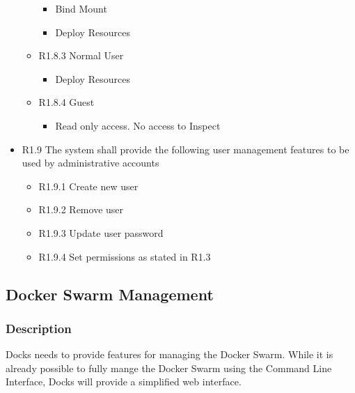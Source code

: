 \documentclass[]{article}
\begin{document}
\begin{itemize}
\begin{itemize}
			\begin{itemize}
				\item Bind Mount
				\item Deploy Resources
			\end{itemize}
		\item R1.8.3 Normal User
			\begin{itemize}
				\item Deploy Resources
			\end{itemize}
		\item R1.8.4 Guest
			\begin{itemize}
				\item Read only access. No access to Inspect
			\end{itemize}
		\end{itemize}
	\item R1.9 The system shall provide the following user management features to be used by administrative accounts
		\begin{itemize}
			\item R1.9.1 Create new user
			\item R1.9.2 Remove user
			\item R1.9.3 Update user password
			\item R1.9.4 Set permissions as stated in R1.3
		\end{itemize}
\end{itemize}

\subsection{Docker Swarm Management}
\subsubsection{Description}
Docks needs to provide features for managing the Docker Swarm. While it is already possible to fully mange the Docker Swarm using the Command Line Interface, Docks will provide a simplified web interface.
\end{document}
